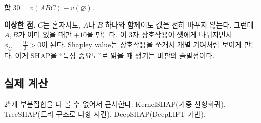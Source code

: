 합 \(30=v(ABC)-v(\varnothing)\).

\textbf{이상한 점.} \(C\)는 혼자서도, \(A\)나 \(B\) 하나와 함께여도 값을
전혀 바꾸지 않는다. 그런데 \(A,B\)가 이미 있을 때만 \(+10\)을 만든다. 이
3자 상호작용이 셋에게 나눠지면서 \(\phi_C=\tfrac{10}{3}>0\)이 된다.
Shapley value는 상호작용을 쪼개서 개별 기여처럼 보이게 만든다. 이게
SHAP을 ``특성 중요도''로 읽을 때 생기는 비판의 출발점이다.

\subsection{실제 계산}

\(2^n\)개 부분집합을 다 볼 수 없어서 근사한다: KernelSHAP(가중
선형회귀), TreeSHAP(트리 구조로 다항 시간), DeepSHAP(DeepLIFT 기반).
